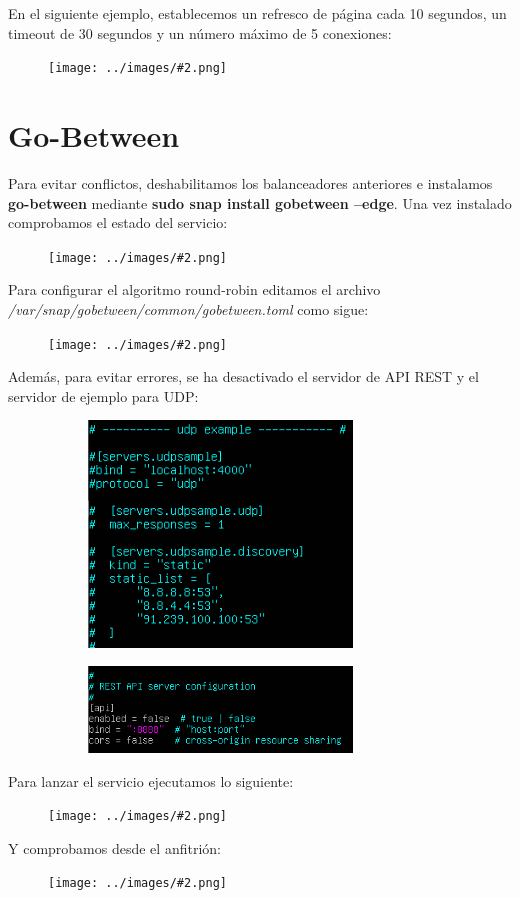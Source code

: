 \documentclass[twoside]{article}
\newcommand{\image}[2]{
\begin{figure}[H]
    \texttt{[image: ../images/\#2.png]}
    \centering
\end{figure}
}
\begin{document}
En el siguiente ejemplo, establecemos un refresco de página cada 10 segundos, un timeout de 30 segundos y un número máximo de 5 conexiones:
\image{8}{28}

\section{Go-Between}
Para evitar conflictos, deshabilitamos los balanceadores anteriores e instalamos \textbf{go-between} mediante \textbf{sudo snap install gobetween --edge}. Una vez instalado comprobamos el estado del servicio:
\image{8}{29}
Para configurar el algoritmo round-robin editamos el archivo \textit{/var/snap/gobetween/common/gobetween.toml} como sigue:
\image{6}{30}
Además, para evitar errores, se ha desactivado el servidor de API REST y el servidor de ejemplo para UDP:
\begin{figure}[H]
    \centering
    \begin{subfigure}{.5\textwidth}
        \centering
        \includegraphics[width=7cm]{../images/31.png}
    \end{subfigure}%
    \begin{subfigure}{.5\textwidth}
        \centering
        \includegraphics[width=7cm]{../images/32.png}
    \end{subfigure}
\end{figure}
Para lanzar el servicio ejecutamos lo siguiente:
\image{8}{33}
Y comprobamos desde el anfitrión:
\image{8}{34}
\end{document}
